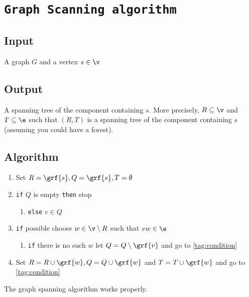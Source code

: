 \section{\texttt{Graph Scanning algorithm}}
\subsection{Input}
A graph $G$ and a vertex $s \in \v$
\subsection{Output}
A spanning tree of the component containing $s$. More precisely, $R \subseteq \v$ and $T \subseteq \e$ such that $(R, T)$ is a spanning tree of the component containing $s$ (assuming you could have a forest).
\subsection{Algorithm}
\begin{enumerate}
    \item Set $R = \grf{s}, Q = \grf{s}, T = \emptyset$
    \item \label{tag:condition} \texttt{if} $Q$ is empty \texttt{then} stop
    \begin{enumerate}
        \item \texttt{else} $v \in Q$
    \end{enumerate}
    \item \texttt{if} possible choose $w \in \v \setminus R$ such that $vw \in \e$
    \begin{enumerate}
        \item \texttt{if} there is no such $w$ let $Q = Q \setminus \grf{v}$ and go to \ref{tag:condition}
    \end{enumerate}
    \item Set $R = R \cup \grf{w}, Q = Q \cup \grf{w}$ and $T = T \cup \grf{w}$ and go to \ref{tag:condition}
\end{enumerate}
\begin{customlemma}{1.18}
    \label{lemma:1.18}
    The graph spanning algorithm works properly.
\end{customlemma}
